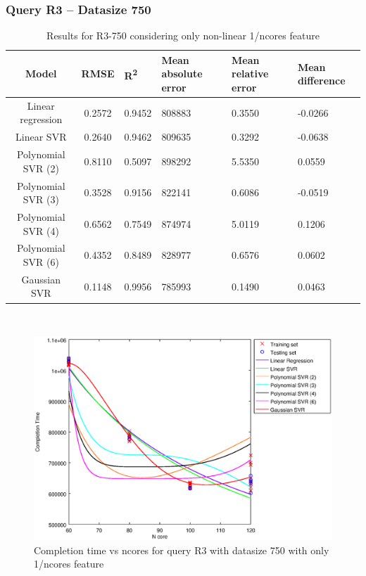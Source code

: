 \documentclass[a4paper,11pt]{article}
\begin{document}
\newpage
\subsubsection{Query R3 -- Datasize 750}
\begin{table}[H]
	\centering
	\begin{adjustbox}{center}
		\begin{tabular}{c | c M{1.2cm} M{2.5cm} M{2.5cm} M{1.8cm}}
			Model & RMSE & R\textsuperscript{2} & Mean absolute error & Mean relative error & Mean difference \tabularnewline
			\hline
			Linear regression & 0.2572 & 0.9452 & 808883 & 0.3550 & -0.0266 \\
			Linear SVR & 0.2640 & 0.9462 & 809635 & 0.3292 & -0.0638 \\
			Polynomial SVR (2) & 0.8110 & 0.5097 & 898292 & 5.5350 & 0.0559 \\
			Polynomial SVR (3) & 0.3528 & 0.9156 & 822141 & 0.6086 & -0.0519 \\
			Polynomial SVR (4) & 0.6562 & 0.7549 & 874974 & 5.0119 & 0.1206 \\
			Polynomial SVR (6) & 0.4352 & 0.8489 & 828977 & 0.6576 & 0.0602 \\
			Gaussian SVR & 0.1148 & 0.9956 & 785993 & 0.1490 & 0.0463 \\
		\end{tabular}
	\end{adjustbox}
	\\
	\caption{Results for R3-750 considering only non-linear 1/ncores feature}
	\label{table_R3_prediction_all}
\end{table}

\begin {figure}[hbtp]
\centering
\includegraphics[width=\textwidth]{output/R3_750_ONLY_1_OVER_NCORES/plot_R3_750.eps}
\caption {Completion time vs ncores for query R3 with datasize 750 with only 1/ncores feature}
\end {figure}
\end{document}
